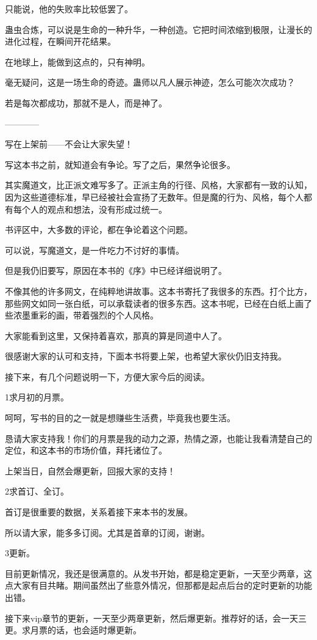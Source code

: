 \begin{this_body}
只能说，他的失败率比较低罢了。

蛊虫合炼，可以说是生命的一种升华，一种创造。它把时间浓缩到极限，让漫长的进化过程，在瞬间开花结果。

在地球上，能做到这点的，只有神明。

毫无疑问，这是一场生命的奇迹。蛊师以凡人展示神迹，怎么可能次次成功？

若是每次都成功，那就不是人，而是神了。

------------

写在上架前——不会让大家失望！

写这本书之前，就知道会有争论。写了之后，果然争论很多。

其实魔道文，比正派文难写多了。正派主角的行径、风格，大家都有一致的认知，因为这些道德标准，早已经被社会宣扬了无数年。但是魔的行为、风格，每个人都有每个人的观点和想法，没有形成过统一。

书评区中，大多数的评论，都在争论着这个问题。

可以说，写魔道文，是一件吃力不讨好的事情。

但是我仍旧要写，原因在本书的《序》中已经详细说明了。

不像其他的许多网文，在纯粹地讲故事。这本书寄托了我很多的东西。打个比方，那些网文如同一张白纸，可以承载读者的很多东西。这本书呢，已经在白纸上画了些浓墨重彩的画，带着强烈的个人风格。

大家能看到这里，又保持着喜欢，那真的算是同道中人了。

很感谢大家的认可和支持，下面本书将要上架，也希望大家伙仍旧支持我。

接下来，有几个问题说明一下，方便大家今后的阅读。

1求月初的月票。

呵呵，写书的目的之一就是想赚些生活费，毕竟我也要生活。

恳请大家支持我！你们的月票是我的动力之源，热情之源，也能让我看清楚自己的定位，和这本书的市场价值，拜托诸位了。

上架当日，自然会爆更新，回报大家的支持！

2求首订、全订。

首订是很重要的数据，关系着接下来本书的发展。

所以请大家，能多多订阅。尤其是首章的订阅，谢谢。

3更新。

目前更新情况，我还是很满意的。从发书开始，都是稳定更新，一天至少两章，这点大家有目共睹。期间虽然出了些意外情况，但那都是起点后台的定时更新的功能出错。

接下来vip章节的更新，一天至少两章更新，然后爆更新。推荐好的话，会一天三更。求月票的话，也会适时爆更新。


\end{this_body}
